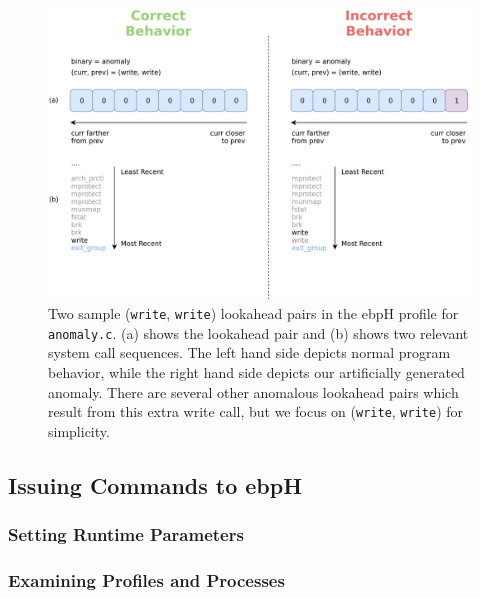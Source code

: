 \documentclass[
  12pt]{findlay}
\begin{document}
\begin{figure}
\begin{center}
\includegraphics[height=0.45\paperheight]{../figures/lookahead-anomaly.png}
\end{center}
\caption[Two sample (\lstinline{write}, \lstinline{write}) lookahead pairs in the ebpH profile for \lstinline{anomaly.c}.]
{
Two sample (\lstinline{write}, \lstinline{write}) lookahead pairs in the ebpH profile for \lstinline{anomaly.c}.
(a) shows the lookahead pair and (b) shows two relevant system call sequences. The left hand side depicts normal program
behavior, while the right hand side depicts our artificially generated anomaly.
There are several other anomalous lookahead pairs which result from this extra write call, but we focus
on (\lstinline{write}, \lstinline{write}) for simplicity.
}
\label{anomaly-lookahead-comp}
\end{figure}

\FloatBarrier

\hypertarget{issuing-commands-to-ebph}{%
\subsection{Issuing Commands to ebpH}\label{issuing-commands-to-ebph}}

\hypertarget{setting-runtime-parameters}{%
\subsubsection{Setting Runtime
Parameters}\label{setting-runtime-parameters}}

\hypertarget{examining-profiles-and-processes}{%
\subsubsection{Examining Profiles and
Processes}\label{examining-profiles-and-processes}}
\end{document}
